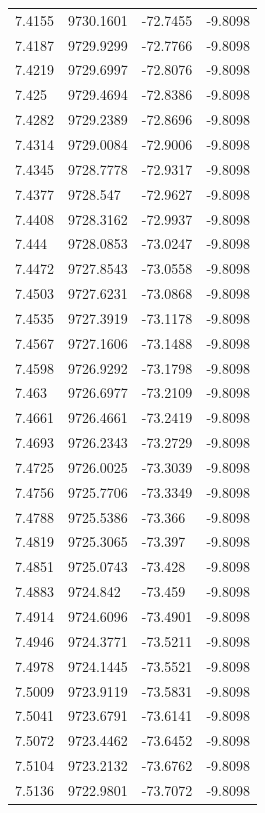 \begin{table}[H]
\begin{tabular}{llll}
7.4155 & 9730.1601 & -72.7455 & -9.8098 \\
7.4187 & 9729.9299 & -72.7766 & -9.8098 \\
7.4219 & 9729.6997 & -72.8076 & -9.8098 \\
7.425 & 9729.4694 & -72.8386 & -9.8098 \\
7.4282 & 9729.2389 & -72.8696 & -9.8098 \\
7.4314 & 9729.0084 & -72.9006 & -9.8098 \\
7.4345 & 9728.7778 & -72.9317 & -9.8098 \\
7.4377 & 9728.547 & -72.9627 & -9.8098 \\
7.4408 & 9728.3162 & -72.9937 & -9.8098 \\
7.444 & 9728.0853 & -73.0247 & -9.8098 \\
7.4472 & 9727.8543 & -73.0558 & -9.8098 \\
7.4503 & 9727.6231 & -73.0868 & -9.8098 \\
7.4535 & 9727.3919 & -73.1178 & -9.8098 \\
7.4567 & 9727.1606 & -73.1488 & -9.8098 \\
7.4598 & 9726.9292 & -73.1798 & -9.8098 \\
7.463 & 9726.6977 & -73.2109 & -9.8098 \\
7.4661 & 9726.4661 & -73.2419 & -9.8098 \\
7.4693 & 9726.2343 & -73.2729 & -9.8098 \\
7.4725 & 9726.0025 & -73.3039 & -9.8098 \\
7.4756 & 9725.7706 & -73.3349 & -9.8098 \\
7.4788 & 9725.5386 & -73.366 & -9.8098 \\
7.4819 & 9725.3065 & -73.397 & -9.8098 \\
7.4851 & 9725.0743 & -73.428 & -9.8098 \\
7.4883 & 9724.842 & -73.459 & -9.8098 \\
7.4914 & 9724.6096 & -73.4901 & -9.8098 \\
7.4946 & 9724.3771 & -73.5211 & -9.8098 \\
7.4978 & 9724.1445 & -73.5521 & -9.8098 \\
7.5009 & 9723.9119 & -73.5831 & -9.8098 \\
7.5041 & 9723.6791 & -73.6141 & -9.8098 \\
7.5072 & 9723.4462 & -73.6452 & -9.8098 \\
7.5104 & 9723.2132 & -73.6762 & -9.8098 \\
7.5136 & 9722.9801 & -73.7072 & -9.8098 \\

\end{tabular}
\end{table}
